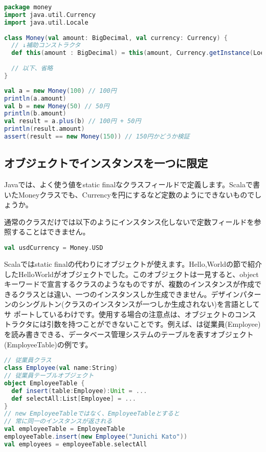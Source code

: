 \begin{lstlisting}[language=scala, label=src:aux_const, caption=補助コンストラクタの例]
package money
import java.util.Currency
import java.util.Locale
 
class Money(val amount: BigDecimal, val currency: Currency) {
  // ↓補助コンストラクタ
  def this(amount : BigDecimal) = this(amount, Currency.getInstance(Locale.getDefault))
   
  // 以下、省略
} 
\end{lstlisting}

\begin{lstlisting}[language=scala, label=src:aux_const_test, caption=\lstRef{src:aux_const}用のテストコード]
val a = new Money(100) // 100円
println(a.amount)
val b = new Money(50) // 50円
println(b.amount)
val result = a.plus(b) // 100円 + 50円
println(result.amount)
assert(result == new Money(150)) // 150円かどうか検証
\end{lstlisting}

\subsection{オブジェクトでインスタンスを一つに限定}
Javaでは、よく使う値をstatic finalなクラスフィールドで定義します。Scalaで書いたMoneyクラスでも、Currencyを円にするなど定数のようにできないものでしょうか。 

通常のクラスだけでは以下のようにインスタンス化しないで定数フィールドを参照することはできません。
\begin{lstlisting}[language=scala, frame=none]
val usdCurrency = Money.USD
\end{lstlisting}

Scalaではstatic finalの代わりにオブジェクトが使えます。Hello,Worldの節で紹介したHelloWorldがオブジェクトでした。このオブジェクトは一見すると、objectキーワードで宣言するクラスのようなものですが、複数のインスタンスが作成できるクラスとは違い、一つのインスタンスしか生成できません。デザインパターンのシングルトン(クラスのインスタンスが一つしか生成されない)を言語としてサ ポートしているわけです。使用する場合の注意点は、オブジェクトのコンストラクタには引数を持つことができないことです。例えば、は従業員(Employee)を読み書きできる、データベース管理システムのテーブルを表すオブジェクト(EmployeeTable)の例です。 

\begin{lstlisting}[language=scala, label=src:dao_object, caption=データベース管理システムのテーブルを表すオブジェクトの例]
// 従業員クラス
class Employee(val name:String)
// 従業員テーブルオブジェクト
object EmployeeTable {
  def insert(table:Employee):Unit = ...
  def selectAll:List[Employee] = ... 
}
// new EmployeeTableではなく、EmployeeTableとすると
// 常に同一のインスタンスが返される
val employeeTable = EmployeeTable
employeeTable.insert(new Employee("Junichi Kato"))
val employees = employeeTable.selectAll
\end{lstlisting}

